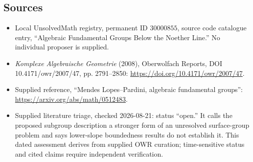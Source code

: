 \documentclass[11pt]{article}
\begin{document}
\subsection{Sources}
\begin{itemize}
\item Local UnsolvedMath registry, permanent ID \(30000855\), source code catalogue entry, ``Algebraic Fundamental Groups Below the Noether Line.'' No individual proposer is supplied.
\item \emph{Komplexe Algebraische Geometrie} (2008), Oberwolfach Reports, DOI 10.4171/owr/2007/47, pp. 2791--2850: \url{https://doi.org/10.4171/owr/2007/47}.
\item Supplied reference, ``Mendes Lopes--Pardini, algebraic fundamental groups'': \url{https://arxiv.org/abs/math/0512483}.
\item Supplied literature triage, checked 2026-08-21: status ``open.'' It calls the proposed subgroup description a stronger form of an unresolved surface-group problem and says lower-slope boundedness results do not establish it. This dated assessment derives from supplied OWR curation; time-sensitive status and cited claims require independent verification.
\end{itemize}
\end{document}

